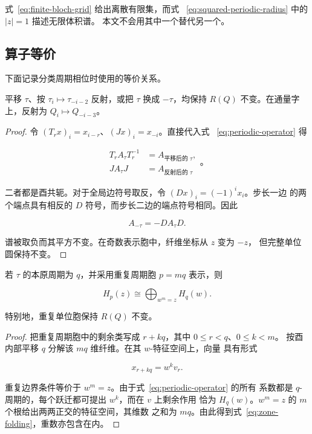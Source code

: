 式~\eqref{eq:finite-bloch-grid} 给出离散有限集，而式~
\eqref{eq:squared-periodic-radius} 中的 \(\lvert z\rvert=1\) 描述无限体积谱。
本文不会用其中一个替代另一个。

\subsection{算子等价}

下面记录分类周期相位时使用的等价关系。

\begin{lemma}[平移、反射与边符号取反]
\label{lem:operator-equivalences}
平移 \(\tau\)、按 \(\tau_i\mapsto\tau_{-i-2}\) 反射，或把 \(\tau\) 换成
\(-\tau\)，均保持 \(R(Q)\) 不变。在通量字上，反射为
\(Q_i\mapsto Q_{-i-3}\)。

\end{lemma}
\begin{proof}
令 \((T_rx)_i=x_{i-r}\)、\((Jx)_i=x_{-i}\)。直接代入式~
\eqref{eq:periodic-operator} 得

\begin{equation}
\begin{aligned}
T_r A_\tau T_r^{-1}&=A_{\text{平移后的 }\tau}, \\
J A_\tau J&=A_{\text{反射后的 }\tau}
\end{aligned}
\text{。}
\end{equation}

二者都是酉共轭。对于全局边符号取反，令 \((Dx)_i=(-1)^ix_i\)。步长一边
的两个端点具有相反的 \(D\) 符号，而步长二边的端点符号相同。因此

\begin{equation}
A_{-\tau}=-D A_\tau D.
\end{equation}

谱被取负而其平方不变。在奇数表示胞中，纤维坐标从 \(z\) 变为 \(-z\)，
但完整单位圆保持不变。

\end{proof}
\begin{lemma}[能区折叠]
\label{lem:zone-folding}
若 \(\tau\) 的本原周期为 \(q\)，并采用重复周期胞 \(p=mq\) 表示，则

\begin{equation}
\label{eq:zone-folding}
H_p(z) \cong \bigoplus_{w^m=z} H_q(w).
\end{equation}

特别地，重复单位胞保持 \(R(Q)\) 不变。

\end{lemma}
\begin{proof}
把重复周期胞中的剩余类写成 \(r+kq\)，其中 \(0\leq r<q\)、\(0\leq k<m\)。
按酉内部平移 \(q\) 分解该 \(mq\) 维纤维。在其 \(w\)-特征空间上，向量
具有形式

\begin{equation}
x_{r+kq}=w^k v_r.
\end{equation}

重复边界条件等价于 \(w^m=z\)。由于式~\eqref{eq:periodic-operator} 的所有
系数都是 \(q\)-周期的，每个跃迁都可提出 \(w^k\)，而在 \(v\) 上剩余作用
恰为 \(H_q(w)\)。\(w^m=z\) 的 \(m\) 个根给出两两正交的特征空间，其维数
之和为 \(mq\)。由此得到式~\eqref{eq:zone-folding}，重数亦包含在内。

\end{proof}

